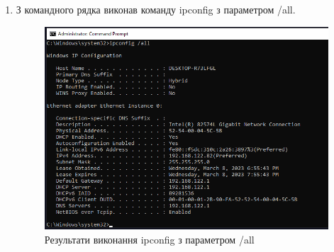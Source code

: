 \documentclass{article}
\begin{document}
\begin{normalsize}
\begin{enumerate}
\item З командного рядка виконав команду ipconfig з параметром /all. 
	\begin{figure}[H]
	\centering
	\includegraphics[scale=0.6]{4}
	\caption{Результати виконання ipconfig з параметром /all
	}
\end{figure}


\end{enumerate}
\end{normalsize}
\end{document}
